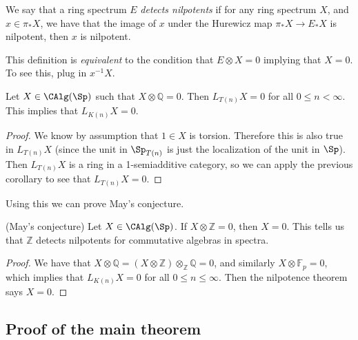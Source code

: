 \begin{definition} We say that a ring spectrum $E$ \textit{detects nilpotents} if for any ring spectrum $X$, and $x \in \pi_\ast X$, we have that the image of $x$ under the Hurewicz map $\pi_\ast X \to E_\ast X$ is nilpotent, then $x$ is nilpotent.
\end{definition}

\begin{remark} This definition is \textit{equivalent} to the condition that $E \otimes X = 0$ implying that $X = 0$. To see this, plug in $x^{-1}X$.
\end{remark}

\begin{corollary} Let $X \in \CAlg(\Sp)$ such that $X \otimes \mathbb{Q} = 0$. Then $L_{T(n)} X = 0$ for all $0\le n < \infty$. This implies that $L_{K(n)} X = 0$.
\end{corollary}
\begin{proof} We know by assumption that $1\in X$ is torsion. Therefore this is also true in $L_{T(n)}X$ (since the unit in $\Sp_{T(n)}$ is just the localization of the unit in $\Sp$). Then $L_{T(n)}X$ is a ring in a 1-semiadditive category, so we can apply the previous corollary to see that $L_{T(n)} X = 0$.
\end{proof}

Using this we can prove May's conjecture.

\begin{corollary} (May's conjecture) Let $X\in \CAlg(\Sp)$. If $X \otimes \mathbb{Z} = 0$, then $X = 0$. This tells us that $ \mathbb{Z}$ detects nilpotents for commutative algebras in spectra.
\end{corollary}
\begin{proof} We have that $X \otimes \mathbb{Q} = \left( X \otimes \mathbb{Z} \right) \otimes_{\mathbb{Z}} \mathbb{Q} = 0$, and similarly $X \otimes \mathbb{F}_p = 0$, which implies that $L_{K(n)} X = 0$ for all $0\le n\le \infty$. Then the nilpotence theorem says $X=0$.
\end{proof}

\subsection{Proof of the main theorem}

